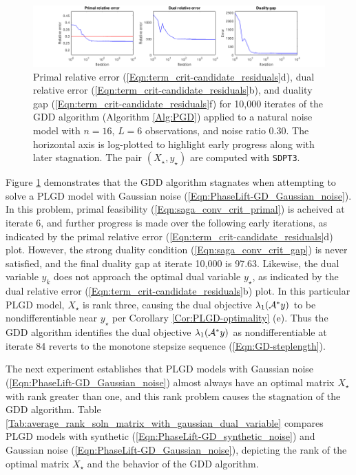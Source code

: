 \begin{figure}[H]
\hspace{-1.7cm}  \includegraphics[scale=0.6]{noisy_random_signal_relative_errors_stagnate}
\caption{Primal relative error (\ref{Eqn:term_crit-candidate_residuals}d), dual relative error (\ref{Eqn:term_crit-candidate_residuals}b), and duality gap (\ref{Eqn:term_crit-candidate_residuals}f) for 10,000 iterates of the GDD algorithm (Algorithm \ref{Alg:PGD}) applied to a natural noise model with $n=16$, $L=6$ observations, and noise ratio $0.30$.  The horizontal axis is log-plotted to highlight early progress along with later stagnation.  The pair $(X_\star, y_\star)$ are computed with \texttt{SDPT3}.}
\label{Fig:noisy_random_relative_errors_stagnate}
\end{figure}


Figure \ref{Fig:noisy_random_relative_errors_stagnate} demonstrates that the GDD algorithm stagnates when attempting to solve a PLGD model with Gaussian noise (\ref{Eqn:PhaseLift-GD_Gaussian_noise}).  In this problem, primal feasibility (\ref{Eqn:saga_conv_crit_primal}) is acheived at iterate 6, and further progress is made over the following early iterations, as indicated by the primal relative error (\ref{Eqn:term_crit-candidate_residuals}d) plot.  However, the strong duality condition (\ref{Eqn:saga_conv_crit_gap}) is never satisfied, and the final duality gap at iterate 10,000 is 97.63.  Likewise, the dual variable $y_k$ does not approach the optimal dual variable $y_\star$, as indicated by the dual relative error (\ref{Eqn:term_crit-candidate_residuals}b) plot.  In this particular PLGD model, $X_\star$ is rank three, causing the dual objective $\lambda_1({\mathcal A}^*y)$ to be nondifferentiable near $y_\star$ per Corollary \ref{Cor:PLGD-optimality} (e).  Thus the GDD algorithm identifies the dual objective $\lambda_1({\mathcal A}^*y)$ as nondifferentiable at iterate 84 reverts to the monotone stepsize sequence (\ref{Eqn:GD-steplength}).  


The next experiment establishes that PLGD models with Gaussian noise (\ref{Eqn:PhaseLift-GD_Gaussian_noise}) almost always have an optimal matrix $X_\star$ with rank greater than one, and this rank problem causes the stagnation of the GDD algorithm.  Table \ref{Tab:average_rank_soln_matrix_with_gaussian_dual_variable} compares PLGD models with synthetic (\ref{Eqn:PhaseLift-GD_synthetic_noise}) and Gaussian noise (\ref{Eqn:PhaseLift-GD_Gaussian_noise}), depicting the rank of the optimal matrix $X_\star$ and the behavior of the GDD algorithm.

